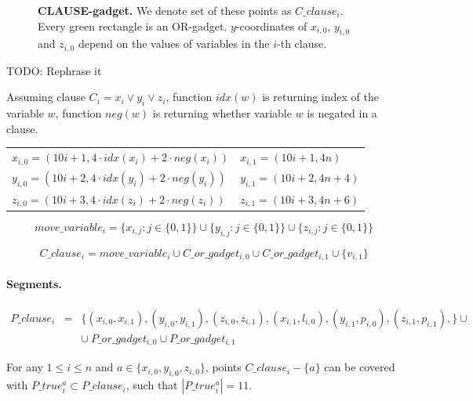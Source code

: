 \begin{figure}[h]
\centering
\def\svgwidth{0.8\columnwidth}

\caption{\textbf{CLAUSE-gadget.}
We denote set of these points as $C\_clause_i$.
Every green rectangle is an OR-gadget.
$y$-coordinates of $x_{i, 0}$, $y_{i, 0}$ and $z_{i,0}$
depend on the values of variables in the $i$-th clause.
}
\label{fig:apx_clause}
\end{figure}

TODO: Rephrase it

Assuming clause $C_i = x_i \lor y_i \lor z_i$,
function $idx(w)$ is returning index of the variable $w$,
function $neg(w)$ is returning whether variable $w$ is negated
in a clause.

\begin{center}
\begin{tabular}{ l l }
	$x_{i, 0} = (10i+1, 4\cdot idx(x_i) + 2\cdot neg(x_i))$ &
	$x_{i, 1} = (10i+1, 4n)$ \\
	$y_{i, 0} = (10i+2, 4\cdot idx(y_i) + 2\cdot neg(y_i))$ &
	$y_{i, 1} = (10i+2, 4n + 4)$ \\
	$z_{i, 0} = (10i+3, 4\cdot idx(z_i) + 2\cdot neg(z_i))$ &
	$z_{i, 1} = (10i+3, 4n + 6)$
\end{tabular}
\end{center}
	
 
 $$move\_variable_i = 
 \{x_{i, j} : j \in \{0, 1\}\} \cup
 \{y_{i, j} : j \in \{0, 1\}\} \cup
 \{z_{i, j} : j \in \{0, 1\}\} 
 $$
 
 $$C\_clause_i = 
 move\_variable_i \cup C\_or\_gadget_{i, 0}
 \cup C\_or\_gadget_{i, 1} \cup \{v_{i, 1} \} 
 $$

\paragraph{Segments.}

\begin{eqnarray*}
P\_clause_i & = & \{ (x_{i, 0}, x_{i, 1}),
(y_{i, 0}, y_{i, 1}),
(z_{i, 0}, z_{i, 1}),
(x_{i, 1}, l_{i, 0}),
(y_{i, 1}, p_{i, 0}),
(z_{i, 1}, p_{i, 1}),
\} \cup \\
& & \cup \ P\_or\_gadget_{i, 0} \cup P\_or\_gadget_{i, 1}
\end{eqnarray*}

\begin{lemma}
\label{cover_clauses_solution_true}
For any $1 \le i \le n$ and $a \in \{ x_{i, 0}, y_{i, 0}, z_{i, 0}\}$,
points $C\_clause_i - \{a\}$ can be covered with $P\_true^a_i \subset P\_clause_i$,
such that $|P\_true^a_i| = 11$.
\end{lemma}

